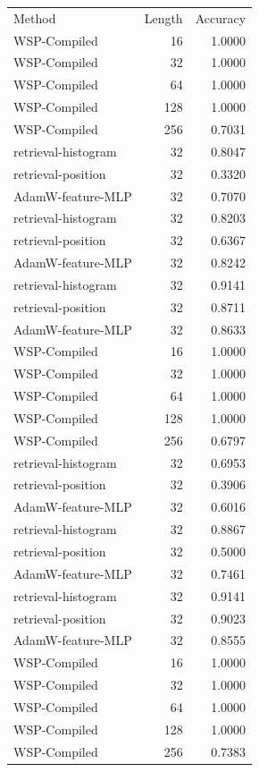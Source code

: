\begin{tabular}{lrr}
Method & Length & Accuracy \\
WSP-Compiled & 16 & 1.0000 \\
WSP-Compiled & 32 & 1.0000 \\
WSP-Compiled & 64 & 1.0000 \\
WSP-Compiled & 128 & 1.0000 \\
WSP-Compiled & 256 & 0.7031 \\
retrieval-histogram & 32 & 0.8047 \\
retrieval-position & 32 & 0.3320 \\
AdamW-feature-MLP & 32 & 0.7070 \\
retrieval-histogram & 32 & 0.8203 \\
retrieval-position & 32 & 0.6367 \\
AdamW-feature-MLP & 32 & 0.8242 \\
retrieval-histogram & 32 & 0.9141 \\
retrieval-position & 32 & 0.8711 \\
AdamW-feature-MLP & 32 & 0.8633 \\
WSP-Compiled & 16 & 1.0000 \\
WSP-Compiled & 32 & 1.0000 \\
WSP-Compiled & 64 & 1.0000 \\
WSP-Compiled & 128 & 1.0000 \\
WSP-Compiled & 256 & 0.6797 \\
retrieval-histogram & 32 & 0.6953 \\
retrieval-position & 32 & 0.3906 \\
AdamW-feature-MLP & 32 & 0.6016 \\
retrieval-histogram & 32 & 0.8867 \\
retrieval-position & 32 & 0.5000 \\
AdamW-feature-MLP & 32 & 0.7461 \\
retrieval-histogram & 32 & 0.9141 \\
retrieval-position & 32 & 0.9023 \\
AdamW-feature-MLP & 32 & 0.8555 \\
WSP-Compiled & 16 & 1.0000 \\
WSP-Compiled & 32 & 1.0000 \\
WSP-Compiled & 64 & 1.0000 \\
WSP-Compiled & 128 & 1.0000 \\
WSP-Compiled & 256 & 0.7383 \\

\end{tabular}
